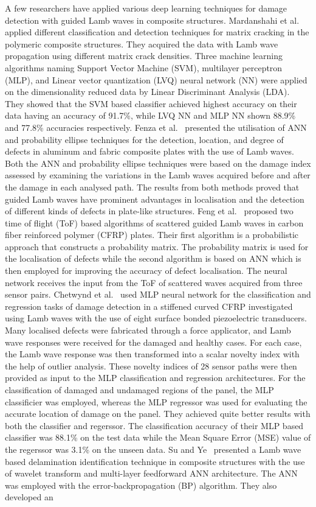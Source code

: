A few researchers have applied various deep learning techniques for damage detection with guided Lamb waves in composite structures. Mardanshahi et al.~\cite{mardanshahi2020detection} applied different classification and detection techniques for matrix cracking in the polymeric composite structures. They acquired the data with Lamb wave propagation using different matrix crack densities. Three machine learning algorithms naming Support Vector Machine (SVM), multilayer perceptron (MLP), and Linear vector quantization (LVQ) neural network (NN) were applied on the dimensionality reduced data by Linear Discriminant Analysis (LDA). They showed that the SVM based classifier achieved highest accuracy on their data having an accuracy of 91.7\%, while LVQ NN and MLP NN shown 88.9\% and 77.8\% accuracies respectively. Fenza et al.~\cite{de2015application} presented the utilisation of ANN and probability ellipse techniques for the detection, location, and degree of defects in aluminum and fabric composite plates with the use of Lamb waves. Both the ANN and probability ellipse techniques were based on the damage index assessed by examining the variations in the Lamb waves acquired before and after the damage in each analysed path. The results from both methods proved that guided Lamb waves have prominent advantages in localisation and the detection of different kinds of defects in plate-like structures. Feng et al.~\cite{feng2019locating} proposed two time of flight (ToF) based algorithms of scattered guided Lamb waves in carbon fiber reinforced polymer (CFRP) plates. Their first algorithm is a probabilistic approach that constructs a probability matrix. The probability matrix is used for the localisation of defects while the second algorithm is based on ANN which is then employed for improving the accuracy of defect localisation. The neural network receives the input from the ToF of scattered waves acquired from three sensor pairs. Chetwynd et al.~\cite{chetwynd2008damage} used MLP neural network for the classification and regression tasks of damage detection in a stiffened curved CFRP investigated using Lamb waves with the use of eight surface bonded piezoelectric transducers. Many localised defects were fabricated through a force applicator, and Lamb wave responses were received for the damaged and healthy cases. For each case, the Lamb wave response was then transformed into a scalar novelty index with the help of outlier analysis. These novelty indices of 28 sensor paths were then provided as input to the MLP classification and regression architectures. For the classification of damaged and undamaged regions of the panel, the MLP classificier was employed, whereas the MLP regressor was used for evaluating the accurate location of damage on the panel. They achieved quite better results with both the classifier and regerssor. The classification accuracy of their MLP based classifier was 88.1\% on the test data while the Mean Square Error (MSE) value of the regerssor was 3.1\% on the unseen data. Su and Ye~\cite{su2004lamb} presented a Lamb wave based delamination identification technique in composite structures with the use of wavelet transform and multi-layer feedforward ANN architecture. The ANN was employed with the error-backpropagation (BP) algorithm. They also developed an 